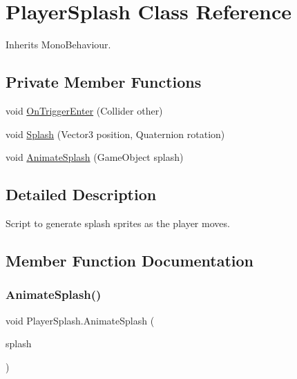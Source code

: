 \hypertarget{class_player_splash}{}\section{Player\+Splash Class Reference}
\label{class_player_splash}


Inherits Mono\+Behaviour.

\subsection*{Private Member Functions}
\begin{DoxyCompactItemize}
\item 
void \hyperlink{class_player_splash_a19c86b6b926d2d274e54ed300fc0233f}{On\+Trigger\+Enter} (Collider other)
\item 
void \hyperlink{class_player_splash_a15b0ea50799fed0ddbc77b61fbc268f1}{Splash} (Vector3 position, Quaternion rotation)
\item 
void \hyperlink{class_player_splash_aab2a19f9d25960e67532e8b8109cb284}{Animate\+Splash} (Game\+Object splash)
\end{DoxyCompactItemize}


\subsection{Detailed Description}
Script to generate splash sprites as the player moves. 



\subsection{Member Function Documentation}
\mbox{\label{class_player_splash_aab2a19f9d25960e67532e8b8109cb284}} 
\subsubsection{\texorpdfstring{Animate\+Splash()}{AnimateSplash()}}
{\footnotesize\ttfamily void Player\+Splash.\+Animate\+Splash (\begin{DoxyParamCaption}\item[{Game\+Object}]{splash }\end{DoxyParamCaption})\hspace{0.3cm}{\ttfamily [private]}}



